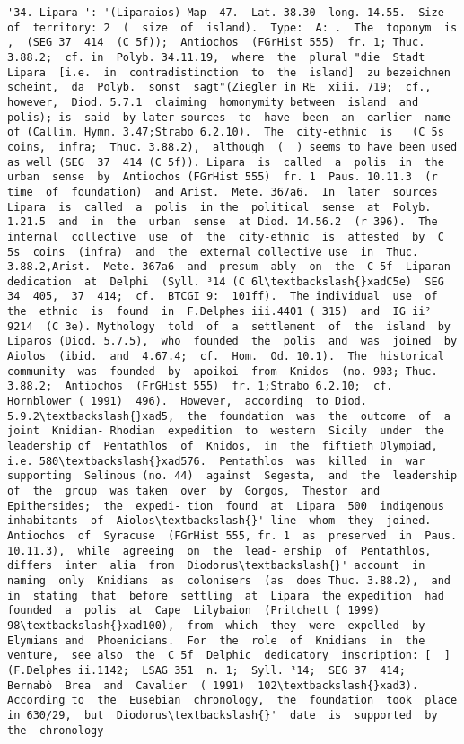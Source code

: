 \documentclass[11pt]{article}
\begin{document}
\begin{Verbatim}[commandchars=\\\{\}]
         '34. Lipara ': '(Liparaios) Map  47.  Lat. 38.30  long. 14.55.  Size of  territory: 2  (  size  of  island).  Type:  A: .  The  toponym  is ,  (SEG 37  414  (C 5f));  Antiochos  (FGrHist 555)  fr. 1; Thuc. 3.88.2;  cf. in  Polyb. 34.11.19,  where  the  plural "die  Stadt  Lipara  [i.e.  in  contradistinction  to  the  island]  zu bezeichnen  scheint,  da  Polyb.  sonst  sagt"(Ziegler in RE  xiii. 719;  cf.,  however,  Diod. 5.7.1  claiming  homonymity between  island  and  polis); is  said  by later sources  to  have  been  an  earlier  name  of (Callim. Hymn. 3.47;Strabo 6.2.10).  The  city-ethnic  is   (C 5s  coins,  infra;  Thuc. 3.88.2),  although  (  ) seems to have been used as well (SEG  37  414 (C 5f)). Lipara  is  called  a  polis  in  the  urban  sense  by  Antiochos (FGrHist 555)  fr. 1  Paus. 10.11.3  (r  time  of  foundation)  and Arist.  Mete. 367a6.  In  later  sources  Lipara  is  called  a  polis  in the  political  sense  at  Polyb. 1.21.5  and  in  the  urban  sense  at Diod. 14.56.2  (r 396).  The  internal  collective  use  of  the  city-ethnic  is  attested  by  C 5s  coins  (infra)  and  the  external collective use  in  Thuc. 3.88.2,Arist.  Mete. 367a6  and  presum- ably  on  the  C 5f  Liparan  dedication  at  Delphi  (Syll. ³14 (C 6l\textbackslash{}xadC5e)  SEG 34  405,  37  414;  cf.  BTCGI 9:  101ff).  The individual  use  of  the  ethnic  is  found  in  F.Delphes iii.4401 ( 315)  and  IG ii²  9214  (C 3e). Mythology  told  of  a  settlement  of  the  island  by  Liparos (Diod. 5.7.5),  who  founded  the  polis  and  was  joined  by Aiolos  (ibid.  and  4.67.4;  cf.  Hom.  Od. 10.1).  The  historical community  was  founded  by  apoikoi  from  Knidos  (no. 903; Thuc. 3.88.2;  Antiochos  (FrGHist 555)  fr. 1;Strabo 6.2.10;  cf. Hornblower ( 1991)  496).  However,  according  to Diod. 5.9.2\textbackslash{}xad5,  the  foundation  was  the  outcome  of  a  joint  Knidian- Rhodian  expedition  to  western  Sicily  under  the  leadership of  Pentathlos  of  Knidos,  in  the  fiftieth Olympiad,  i.e. 580\textbackslash{}xad576.  Pentathlos  was  killed  in  war  supporting  Selinous (no. 44)  against  Segesta,  and  the  leadership  of  the  group  was taken  over  by  Gorgos,  Thestor  and  Epithersides;  the  expedi- tion  found  at  Lipara  500  indigenous  inhabitants  of  Aiolos\textbackslash{}' line  whom  they  joined.  Antiochos  of  Syracuse  (FGrHist 555, fr. 1  as  preserved  in  Paus. 10.11.3),  while  agreeing  on  the  lead- ership  of  Pentathlos,  differs  inter  alia  from  Diodorus\textbackslash{}' account  in  naming  only  Knidians  as  colonisers  (as  does Thuc. 3.88.2),  and  in  stating  that  before  settling  at  Lipara  the expedition  had  founded  a  polis  at  Cape  Lilybaion  (Pritchett ( 1999)  98\textbackslash{}xad100),  from  which  they  were  expelled  by  Elymians and  Phoenicians.  For  the  role  of  Knidians  in  the  venture,  see also  the  C 5f  Delphic  dedicatory  inscription: [  ]    (F.Delphes ii.1142;  LSAG 351  n. 1;  Syll. ³14;  SEG 37  414;  Bernabò  Brea  and  Cavalier  ( 1991)  102\textbackslash{}xad3).  According to  the  Eusebian  chronology,  the  foundation  took  place  in 630/29,  but  Diodorus\textbackslash{}'  date  is  supported  by the  chronology 
\end{Verbatim}
\end{document}
